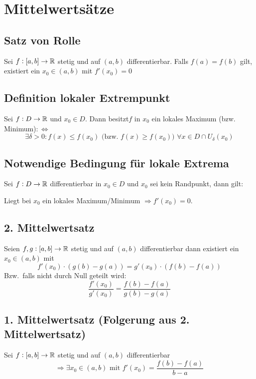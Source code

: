 \section{Mittelwertsätze}

\subsection{Satz von Rolle}
Sei $f: [a, b] \rightarrow \mathbb{R}$ stetig und auf $(a,b)$ differentierbar. Falls
$f(a) = f(b)$ gilt, existiert ein $x_0 \in (a,b)$ mit $f'(x_0)=0$

\subsection{Definition lokaler Extrempunkt}
Sei $f: D \rightarrow \mathbb{R}$ und $x_0 \in D$. Dann besitzt$f$ in $x_0$ ein
lokales Maximum (bzw. Minimum)$:\Leftrightarrow$
\begin{equation*}
    \exists \delta > 0: f(x) \leq f(x_0)
    \text{ (bzw. } f(x) \geq f(x_0) \text{) } \forall x \in D \cap U_\delta(x_0)
\end{equation*}

\subsection{Notwendige Bedingung für lokale Extrema}
Sei $f: D \rightarrow \mathbb{R}$ differentierbar in $x_0 \in D$ und $x_0$ sei kein
Randpunkt, dann gilt:

Liegt bei $x_0$ ein lokales Maximum/Minimum $\Rightarrow f'(x_0)=0$.

\subsection{2. Mittelwertsatz}
Seien $f,g: [a,b] \rightarrow \mathbb{R}$ stetig und auf $(a,b)$ differentierbar
dann existiert ein $x_0 \in (a,b)$ mit
\begin{equation*}
    f'(x_0) \cdot (g(b) - g(a)) = g'(x_0) \cdot (f(b)-f(a))
\end{equation*}
Bzw.\ falls nicht durch Null geteilt wird:
\begin{equation*}
 \frac{f'(x_0)}{g'(x_0)} = \frac{f(b)-f(a)}{g(b)-g(a)}
\end{equation*}

\subsection{1. Mittelwertsatz (Folgerung aus 2. Mittelwertsatz)}
Sei $f: [a,b] \rightarrow \mathbb{R}$ stetig und auf $(a,b)$ differentierbar
\begin{equation*}
    \Rightarrow \exists x_0 \in (a,b) \text{ mit } f'(x_0)=\frac{f(b)-f(a)}{b-a}
\end{equation*}

